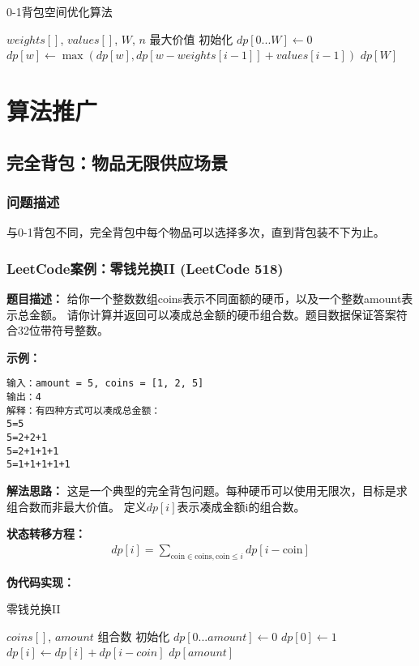 \begin{algorithm}
\caption{0-1背包空间优化算法}
\begin{algorithmic}[1]
\REQUIRE $weights[]$, $values[]$, $W$, $n$
\ENSURE 最大价值
\STATE 初始化 $dp[0...W] \leftarrow 0$
        \STATE $dp[w] \leftarrow \max(dp[w], dp[w-weights[i-1]] + values[i-1])$
    \ENDFOR
\ENDFOR
\RETURN $dp[W]$
\end{algorithmic}
\end{algorithm}

\section{算法推广}

\subsection{完全背包：物品无限供应场景}
\subsubsection{问题描述}
与0-1背包不同，完全背包中每个物品可以选择多次，直到背包装不下为止。

\subsubsection{LeetCode案例：零钱兑换II (LeetCode 518)}
\textbf{题目描述：}
给你一个整数数组coins表示不同面额的硬币，以及一个整数amount表示总金额。
请你计算并返回可以凑成总金额的硬币组合数。题目数据保证答案符合32位带符号整数。

\textbf{示例：}
\begin{verbatim}
输入：amount = 5, coins = [1, 2, 5]
输出：4
解释：有四种方式可以凑成总金额：
5=5
5=2+2+1
5=2+1+1+1
5=1+1+1+1+1
\end{verbatim}

\textbf{解法思路：}
这是一个典型的完全背包问题。每种硬币可以使用无限次，目标是求组合数而非最大价值。
定义$dp[i]$表示凑成金额i的组合数。

\textbf{状态转移方程：}
\begin{align}
dp[i] = \sum_{\text{coin} \in \text{coins}, \text{coin} \leq i} dp[i - \text{coin}]
\end{align}

\textbf{伪代码实现：}
\begin{algorithm}
\caption{零钱兑换II}
\begin{algorithmic}[1]
\REQUIRE $coins[]$, $amount$
\ENSURE 组合数
\STATE 初始化 $dp[0...amount] \leftarrow 0$
\STATE $dp[0] \leftarrow 1$ 
        \STATE $dp[i] \leftarrow dp[i] + dp[i - coin]$
    \ENDFOR
\ENDFOR
\RETURN $dp[amount]$
\end{algorithmic}
\end{algorithm}

